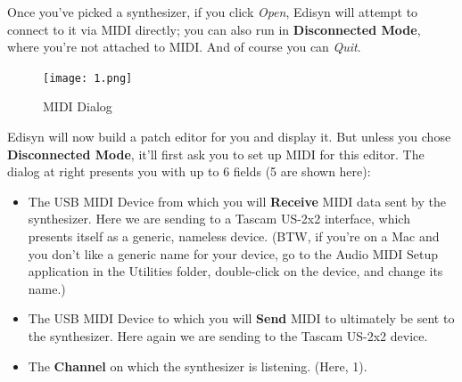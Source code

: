 \documentclass{article}
\begin{document}
Once you've picked a synthesizer, if you click {\it Open}, Edisyn will attempt to connect to it via MIDI directly; you can also run in {\bf Disconnected Mode}, where you're not attached to MIDI.  And of course you can {\it Quit}.

\begin{figure}
\texttt{[image: 1.png]}
\vspace{-1em}\caption{MIDI Dialog}\label{mididialog}
\vspace{-3em}
\end{figure}

Edisyn will now build a patch editor for you and display it.  But unless you chose {\bf Disconnected Mode}, it'll first ask you to set up MIDI for this editor.  The dialog at right presents you with up to 6 fields (5 are shown here):

\begin{itemize}
\item The USB MIDI Device from which you will {\bf Receive} MIDI data sent by the synthesizer.  Here we are sending to a Tascam US-2x2 interface, which presents itself as a generic, nameless device. (BTW, if you're on a Mac and you don't like a generic name for your device, go to the Audio MIDI Setup application in the Utilities folder, double-click on the device, and change its name.)
\item The USB MIDI Device to which you will {\bf Send} MIDI to ultimately be sent to the synthesizer.  Here again we are sending to the Tascam US-2x2 device.
\item The {\bf Channel} on which the synthesizer is listening.  (Here, 1).
\end{itemize}
\end{document}
